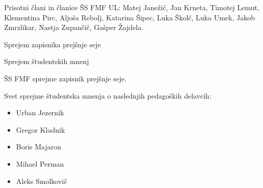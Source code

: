 \documentclass{seja}
\begin{document}
Prisotni člani in članice ŠS FMF UL:
Matej Janežič,
Jan Krneta,
Timotej Lemut,
Klementina Pirc,
Aljoša Rebolj,
Katarina Šipec,
Luka Školč,
Luka Umek,
Jakob Zmrzlikar,
Nastja Zupančič,
Gašper Žajdela.

\begin{red}
	\item
	Sprejem zapisnika prejšnje seje
    \item
    Sprejem študentskih mnenj

\end{red}

\begin{ad}
    \item
    \begin{sklep*}
        ŠS FMF sprejme zapisnik prejšnje seje.
    \end{sklep*}
    
    \item
    \begin{sklep*}
    Svet sprejme študentska mnenja o naslednjih pedagoških delavcih:
    \begin{itemize}
        \item Urban Jezernik
        \item Gregor Kladnik
        \item Boris Majaron
        \item Mihael Perman
        \item Aleks Smolkovič
    \end{itemize}
    \end{sklep*}
\end{ad}

\makeatletter \global\let\@enddocumenthook\@empty \makeatother
{}
\end{document}
